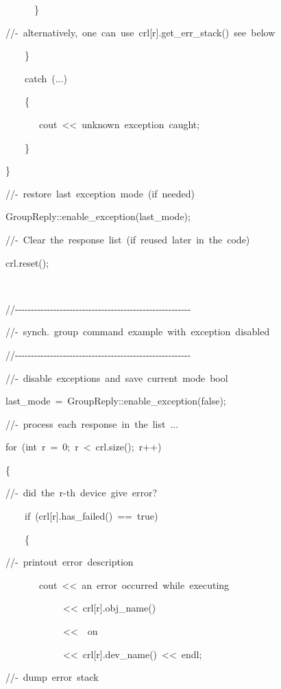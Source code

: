 \begin{lyxcode}
~~~~~~\}

//-~alternatively,~one~can~use~crl{[}r{]}.get\_err\_stack()~see~below

~~~~\}

~~~~catch~(...)

~~~~\{

~~~~~~~cout~<\textcompwordmark{}<~\textquotedbl{}unknown~exception~caught\textquotedbl{};

~~~~\}

\}

//-~restore~last~exception~mode~(if~needed)

GroupReply::enable\_exception(last\_mode);

//-~Clear~the~response~list~(if~reused~later~in~the~code)

crl.reset();

~



//-{}-{}-{}-{}-{}-{}-{}-{}-{}-{}-{}-{}-{}-{}-{}-{}-{}-{}-{}-{}-{}-{}-{}-{}-{}-{}-{}-{}-{}-{}-{}-{}-{}-{}-{}-{}-{}-{}-{}-{}-{}-{}-{}-{}-{}-{}-{}-{}-{}-{}-{}-{}-{}-{}-

//-~synch.~group~command~example~with~exception~disabled

//-{}-{}-{}-{}-{}-{}-{}-{}-{}-{}-{}-{}-{}-{}-{}-{}-{}-{}-{}-{}-{}-{}-{}-{}-{}-{}-{}-{}-{}-{}-{}-{}-{}-{}-{}-{}-{}-{}-{}-{}-{}-{}-{}-{}-{}-{}-{}-{}-{}-{}-{}-{}-{}-{}-

//-~disable~exceptions~and~save~current~mode~bool

last\_mode~=~GroupReply::enable\_exception(false);

//-~process~each~response~in~the~list~...

for~(int~r~=~0;~r~<~crl.size();~r++)

\{

//-~did~the~r-th~device~give~error?

~~~~if~(crl{[}r{]}.has\_failed()~==~true)

~~~~\{

//-~printout~error~description

~~~~~~~cout~<\textcompwordmark{}<~\textquotedbl{}an~error~occurred~while~executing~\textquotedbl{}

~~~~~~~~~~~~<\textcompwordmark{}<~crl{[}r{]}.obj\_name()

~~~~~~~~~~~~<\textcompwordmark{}<~\textquotedbl{}~on~\textquotedbl{}~

~~~~~~~~~~~~<\textcompwordmark{}<~crl{[}r{]}.dev\_name()~<\textcompwordmark{}<~endl;

//-~dump~error~stack


\end{lyxcode}
